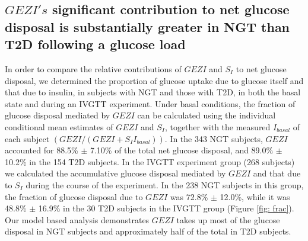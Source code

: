 \documentclass[utf8]{frontiersSCNS} %
\begin{document}
\subsection{$GEZI's$ significant contribution to net glucose disposal is substantially greater in NGT than T2D following a glucose load}
In order to compare the relative contributions of $GEZI$ and $S_I$ to net glucose disposal, we determined the proportion of glucose uptake due to glucose itself and that due to insulin, in subjects with NGT and those with T2D, in both the basal state and during an IVGTT experiment. Under basal conditions, the fraction of glucose disposal mediated by $GEZI$ can be calculated using the individual conditional mean estimates of $GEZI$ and $S_I$, together with the measured $I_{basal}$ of each subject $\left( {GEZI/\left( {GEZI + {S_I}{I_{basal}}} \right)} \right)$. In the 343 NGT subjects, $GEZI$ accounted for 88.5\% $\pm$ 7.10\% of the total net glucose disposal, and 89.0\% $\pm$ 10.2\% in the 154 T2D subjects. In the IVGTT experiment group (268 subjects) we calculated the accumulative glucose disposal mediated by $GEZI$ and that due to $S_I$ during the course of the experiment. In the 238 NGT subjects in this group, the fraction of glucose disposal due to $GEZI$ was 72.8\% $\pm$ 12.0\%, while it was 48.8\% $\pm$ 16.9\% in the 30 T2D subjects in the IVGTT group (Figure \ref{fig: frac}). Our model based analysis demonstrates $GEZI$ takes up most of the glucose disposal in NGT subjects and approximately half of the total in T2D subjects.  
\end{document}
